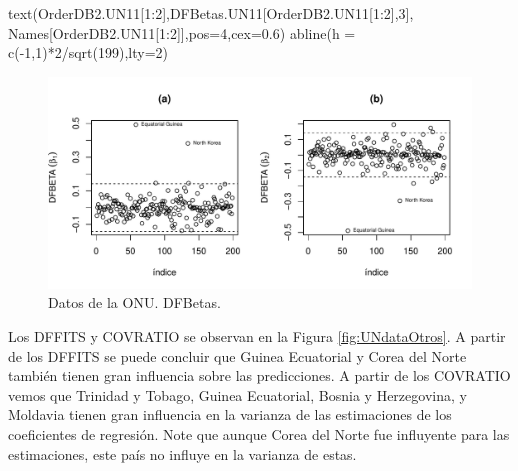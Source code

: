 \documentclass[
]{article}
\newenvironment{Shaded}{\begin{snugshade}}{\end{snugshade}}
\newcommand{\AttributeTok}[1]{\textcolor[rgb]{0.77,0.63,0.00}{#1}}
\newcommand{\DecValTok}[1]{\textcolor[rgb]{0.00,0.00,0.81}{#1}}
\newcommand{\FloatTok}[1]{\textcolor[rgb]{0.00,0.00,0.81}{#1}}
\newcommand{\FunctionTok}[1]{\textcolor[rgb]{0.00,0.00,0.00}{#1}}
\newcommand{\NormalTok}[1]{#1}
\newcommand{\SpecialCharTok}[1]{\textcolor[rgb]{0.00,0.00,0.00}{#1}}
\begin{document}
\begin{Shaded}
\begin{Highlighting}[]
\FunctionTok{text}\NormalTok{(OrderDB2.UN11[}\DecValTok{1}\SpecialCharTok{:}\DecValTok{2}\NormalTok{],DFBetas.UN11[OrderDB2.UN11[}\DecValTok{1}\SpecialCharTok{:}\DecValTok{2}\NormalTok{],}\DecValTok{3}\NormalTok{],}
\NormalTok{     Names[OrderDB2.UN11[}\DecValTok{1}\SpecialCharTok{:}\DecValTok{2}\NormalTok{]],}\AttributeTok{pos=}\DecValTok{4}\NormalTok{,}\AttributeTok{cex=}\FloatTok{0.6}\NormalTok{)}
\FunctionTok{abline}\NormalTok{(}\AttributeTok{h =} \FunctionTok{c}\NormalTok{(}\SpecialCharTok{{-}}\DecValTok{1}\NormalTok{,}\DecValTok{1}\NormalTok{)}\SpecialCharTok{*}\DecValTok{2}\SpecialCharTok{/}\FunctionTok{sqrt}\NormalTok{(}\DecValTok{199}\NormalTok{),}\AttributeTok{lty=}\DecValTok{2}\NormalTok{)}
\end{Highlighting}
\end{Shaded}

\begin{figure}

{\centering \includegraphics{MLGI_files/figure-latex/UNdataDfBetas-1} 

}

\caption{Datos de la ONU. DFBetas.}\label{fig:UNdataDfBetas}
\end{figure}

Los DFFITS y COVRATIO se observan en la Figura \ref{fig:UNdataOtros}. A partir de los DFFITS se puede concluir que Guinea Ecuatorial y Corea del Norte también tienen gran influencia sobre las predicciones. A partir de los COVRATIO vemos que Trinidad y Tobago, Guinea Ecuatorial, Bosnia y Herzegovina, y Moldavia tienen gran influencia en la varianza de las estimaciones de los coeficientes de regresión. Note que aunque Corea del Norte fue influyente para las estimaciones, este país no influye en la varianza de estas.
\end{document}
